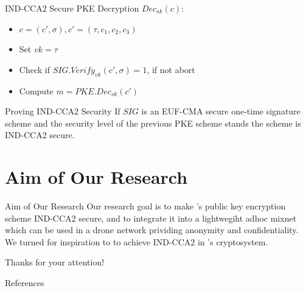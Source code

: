 \documentclass{beamer}
\begin{document}
\begin{frame}{IND-CCA2 Secure PKE Decryption}
  $Dec_{sk}(c)$:
  \begin{itemize}
    \item $c = (c', \sigma), c' = (\tau, c_1, c_2, c_3)$
    \item Set $vk = \tau$
    \item Check if $SIG.Verify_{vk}(c', \sigma) = 1$, if not abort
    \item Compute $m = PKE.Dec_{sk}(c')$
  \end{itemize}

\end{frame}

\begin{frame}{Proving IND-CCA2 Security}
  If $SIG$ is an EUF-CMA secure one-time signature scheme and the security level of the previous PKE scheme stands the scheme is IND-CCA2 secure.
\end{frame}

\section{Aim of Our Research}

\begin{frame}{Aim of Our Research}
  Our research goal is to make \cite{base}'s public key encryption scheme IND-CCA2 secure, and to integrate it into a lightwegiht adhoc mixnet
  which can be used in a drone network prividing anonymity and confidentiality.
  We turned for inspiration to \cite{CCA} to achieve IND-CCA2 in \cite{base}'s cryptosystem.
\end{frame}

\begin{frame}{}
  \centering Thanks for your attention!
\end{frame}

\begin{frame}{References}
  \printbibliography[title=References, heading=bibnumbered,resetnumbers=true]
\end{frame}
\end{document}
